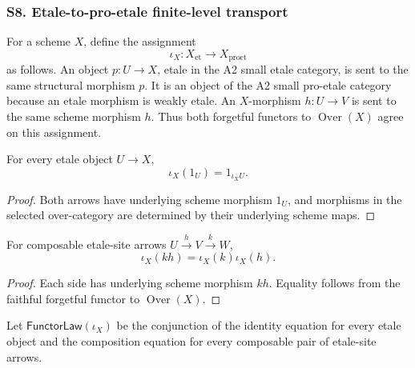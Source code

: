 \subsubsection{S8. Etale-to-pro-etale finite-level transport}

\begin{definition}
\label{def:weil-pbc-etale-proetale-inclusion}
For a scheme $X$, define the assignment
\[
 \iota_X:X_{\mathrm{et}}\longrightarrow X_{\mathrm{proet}}
\]
as follows.  An object $p:U\to X$, etale in the A2 small etale category, is
sent to the same structural morphism $p$.  It is an object of the A2 small
pro-etale category because an etale morphism is weakly etale.  An
$X$-morphism $h:U\to V$ is sent to the same scheme morphism $h$.  Thus both
forgetful functors to $\operatorname{Over}(X)$ agree on this assignment.
\end{definition}


\begin{lemma}
\label{lemma:weil-efi-site-inclusion-identity}
For every etale object $U\to X$,
\[
 \iota_X(1_U)=1_{\iota_XU}.
\]
\end{lemma}
\begin{proof}
Both arrows have underlying scheme morphism $1_U$, and morphisms in the
selected over-category are determined by their underlying scheme maps.
\end{proof}

\begin{lemma}
\label{lemma:weil-efi-site-inclusion-composition}
For composable etale-site arrows $U\xrightarrow{h}V\xrightarrow{k}W$,
\[
 \iota_X(kh)=\iota_X(k)\iota_X(h).
\]
\end{lemma}
\begin{proof}
Each side has underlying scheme morphism $kh$.  Equality follows from the
faithful forgetful functor to $\operatorname{Over}(X)$.
\end{proof}

\begin{definition}
\label{def:weil-efi-site-inclusion-functor-certificate}
Let $\mathsf{FunctorLaw}(\iota_X)$ be the conjunction of the identity equation
for every etale object and the composition equation for every composable pair
of etale-site arrows.
\end{definition}

